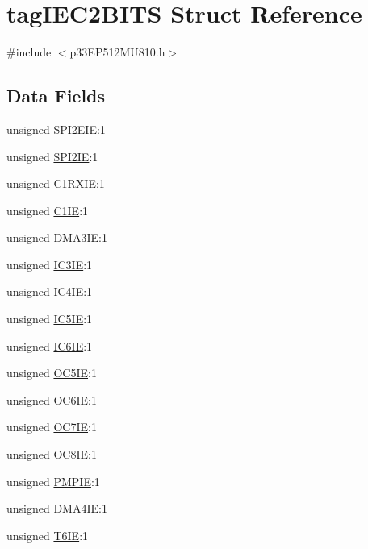 \hypertarget{structtag_i_e_c2_b_i_t_s}{}\section{tag\+I\+E\+C2\+B\+I\+TS Struct Reference}
\label{structtag_i_e_c2_b_i_t_s}


{\ttfamily \#include $<$p33\+E\+P512\+M\+U810.\+h$>$}

\subsection*{Data Fields}
\begin{DoxyCompactItemize}
\item 
unsigned \hyperlink{structtag_i_e_c2_b_i_t_s_a070f19d0e46bf2df08d8ac249b6ba8f7}{S\+P\+I2\+E\+IE}\+:1
\item 
unsigned \hyperlink{structtag_i_e_c2_b_i_t_s_a4fec31f2c4a1d9be3cc954ffe06a4ca5}{S\+P\+I2\+IE}\+:1
\item 
unsigned \hyperlink{structtag_i_e_c2_b_i_t_s_aed211165411ea20fd2c196b7964447f9}{C1\+R\+X\+IE}\+:1
\item 
unsigned \hyperlink{structtag_i_e_c2_b_i_t_s_a36f93b915d7250d58a3b2a1b0ebe0ec3}{C1\+IE}\+:1
\item 
unsigned \hyperlink{structtag_i_e_c2_b_i_t_s_a0ac11d8bc00eb6c0884ffacc7a021af5}{D\+M\+A3\+IE}\+:1
\item 
unsigned \hyperlink{structtag_i_e_c2_b_i_t_s_aba1954a1f9146c89c03864344ab5b8ae}{I\+C3\+IE}\+:1
\item 
unsigned \hyperlink{structtag_i_e_c2_b_i_t_s_a9e29f09985b554eb7765f06a81df3c0b}{I\+C4\+IE}\+:1
\item 
unsigned \hyperlink{structtag_i_e_c2_b_i_t_s_aca7bb9150e2e0368c7bc664e8eefb945}{I\+C5\+IE}\+:1
\item 
unsigned \hyperlink{structtag_i_e_c2_b_i_t_s_a3a0adcf3409538fa59a93d411eda3222}{I\+C6\+IE}\+:1
\item 
unsigned \hyperlink{structtag_i_e_c2_b_i_t_s_a09051cfcac6822eccc14418e3780f1e7}{O\+C5\+IE}\+:1
\item 
unsigned \hyperlink{structtag_i_e_c2_b_i_t_s_a5196a27b3fd85f8f2f7c7b2daad0bc82}{O\+C6\+IE}\+:1
\item 
unsigned \hyperlink{structtag_i_e_c2_b_i_t_s_a7a06ec02d31d887478d5334f71bf388e}{O\+C7\+IE}\+:1
\item 
unsigned \hyperlink{structtag_i_e_c2_b_i_t_s_a52578750258ff9ddf622815cd1937940}{O\+C8\+IE}\+:1
\item 
unsigned \hyperlink{structtag_i_e_c2_b_i_t_s_a0b01aa8cc88cf505892933ff88a1a951}{P\+M\+P\+IE}\+:1
\item 
unsigned \hyperlink{structtag_i_e_c2_b_i_t_s_a94eb77d8f207a1052969e4da53bea278}{D\+M\+A4\+IE}\+:1
\item 
unsigned \hyperlink{structtag_i_e_c2_b_i_t_s_ae9ee13ed51260793c36b82de6a938eb1}{T6\+IE}\+:1
\end{DoxyCompactItemize}


